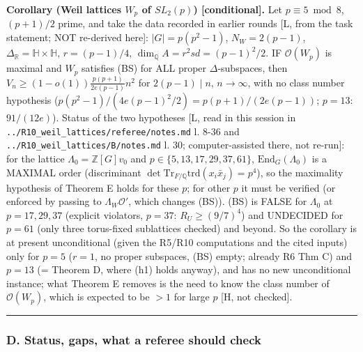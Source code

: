\textbf{Corollary (Weil lattices \(W_p\) of \(SL_2(p)\)) {[}conditional{]}.} Let \(p\equiv5\bmod8\), \((p+1)/2\) prime, and take the data recorded in earlier rounds {[}L, from the task statement; NOT re-derived here{]}: \(|G|=p(p^2-1)\), \(N_W=2(p-1)\), \(\Delta_{\mathbb R}=\mathbb H\times\mathbb H\), \(r=(p-1)/4\), \(\dim_{\mathbb Q}A=r^2sd=(p-1)^2/2\). IF \(\mathcal O(W_p)\) is maximal and \(W_p\) satisfies (BS) for ALL proper \(\Delta\)-subspaces, then \(V_n\ge(1-o(1))\frac{p(p+1)}{2e(p-1)}n^2\) for \(2(p-1)\mid n\), \(n\to\infty\), with no class number hypothesis (\(p(p^2-1)/(4e(p-1)^2/2)=p(p+1)/(2e(p-1))\); \(p=13\): \(91/(12e)\)). Status of the two hypotheses {[}L, read in this session in \texttt{../R10\_weil\_lattices/referee/notes.md} l. 8-36 and \texttt{../R10\_weil\_lattices/B/notes.md} l. 30; computer-assisted there, not re-run{]}: for the lattice \(\Lambda_0=\mathbb Z[G]v_0\) and \(p\in\{5,13,17,29,37,61\}\), \(\mathrm{End}_G(\Lambda_0)\) is a MAXIMAL order (discriminant \(\det\mathrm{Tr}_{F/\mathbb Q}\mathrm{trd}(x_i\bar x_j)=p^4\)), so the maximality hypothesis of Theorem E\textquotesingle{} holds for these \(p\); for other \(p\) it must be verified (or enforced by passing to \(\Lambda_W\mathcal O'\), which changes (BS)). (BS) is FALSE for \(\Lambda_0\) at \(p=17,29,37\) (explicit violators, \(p=37\): \(R_U\ge(9/7)^4\)) and UNDECIDED for \(p=61\) (only three torus-fixed sublattices checked) and beyond. So the corollary is at present unconditional (given the R5/R10 computations and the cited inputs) only for \(p=5\) (\(r=1\), no proper subspaces, (BS) empty; already R6 Thm C\textquotesingle) and \(p=13\) (= Theorem D, where (h1) holds anyway), and has no new unconditional instance; what Theorem E\textquotesingle{} removes is the need to know the class number of \(\mathcal O(W_p)\), which is expected to be \(>1\) for large \(p\) {[}H, not checked{]}.

\begin{center}\rule{0.5\linewidth}{0.5pt}\end{center}

\hypertarget{d.-status-gaps-what-a-referee-should-check}{%
\subsubsection*{D. Status, gaps, what a referee should check}\label{d.-status-gaps-what-a-referee-should-check}}

